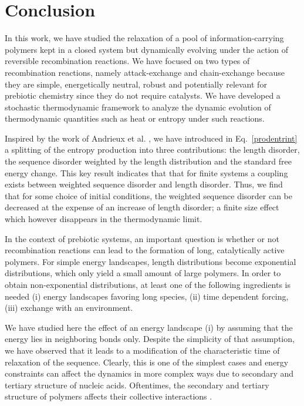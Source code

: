 \documentclass[
	amsmath,
	amssymb,
	a4paper,
	aip,		%
	jcp,		%
	reprint, twocolumn  %
	fleqn,
	showpacs,
	floatfix
]{revtex4-1}
\begin{document}
\section{Conclusion}
In this work, we have studied the relaxation of a pool of information-carrying polymers kept in a closed system but dynamically evolving 
under the action of reversible recombination reactions. We have focused on two types of recombination reactions, namely attack-exchange and
chain-exchange because they are simple, energetically neutral, robust and potentially relevant for prebiotic chemistry 
since they do not require catalysts.
We have developed a stochastic thermodynamic framework to analyze the dynamic evolution of thermodynamic quantities 
such as heat or entropy under such reactions.

Inspired by the work of Andrieux et al. \citep{Andrieux2008_vol105}, we have introduced in Eq.~\eqref{prodentrint} a splitting of the entropy 
production into three contributions: the length disorder, the sequence disorder weighted by the length distribution and the standard free
energy change. This key result indicates that that for finite systems a coupling exists between weighted sequence disorder and length disorder. 
Thus, we find that for some choice of initial conditions, the weighted sequence disorder can be decreased at the expense of an increase of length 
disorder; a finite size effect which however disappears in the thermodynamic limit. 

In the context of prebiotic systems,
an important question is whether or not recombination reactions can lead to the formation of long, 
catalytically active polymers. For simple energy landscapes, length distributions become exponential distributions, 
which only yield a small amount of large polymers. In order to obtain non-exponential distributions,
at least one of the following ingredients is needed 
(i) energy landscapes favoring long species, (ii) time dependent forcing, (iii) exchange with an environment. 


We have studied here the effect of an energy landscape (i) by 
assuming that the energy lies in neighboring bonds only. 
Despite the simplicity of that assumption, we have observed that it leads to a 
modification of the characteristic time of relaxation of the sequence.
Clearly, this is one of the simplest cases and energy constraints can affect the dynamics in more complex ways due to 
secondary and tertiary structure of nucleic acids. Oftentimes, 
the secondary and tertiary structure of polymers affects their collective interactions \cite{Obermayer2011}.
\end{document}

